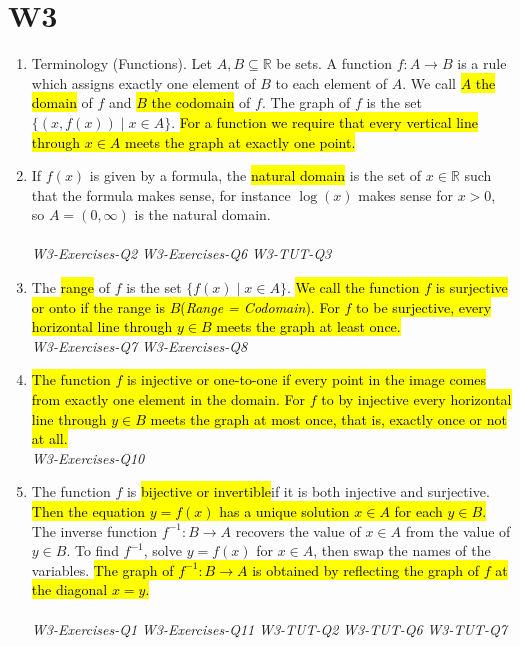 \documentclass[10pt]{article}
\begin{document}
\newpage


\section{W3}

\begin{enumerate}
\item Terminology (Functions). Let $A, B \subseteq \mathbb{R}$ be sets. A function $f: A \rightarrow B$ is a rule which assigns exactly one element of $B$ to each element of $A$. We call \hl{$A$ the domain} of $f$ and\hl{ $B$ the codomain} of $f$. The graph of $f$ is the set $\{(x, f(x)) \mid x \in A\}$. \hl{For a function we require that every vertical line through $x \in A$ meets the graph at exactly one point.}

\item If $f(x)$ is given by a formula, the \hl{natural domain} is the set of $x \in \mathbb{R}$ such that the formula makes sense, for instance $\log (x)$ makes sense for $x>0$, so $A=(0, \infty)$ is the natural domain.\\\\
\textit{W3-Exercises-Q2}
\textit{W3-Exercises-Q6}
\textit{W3-TUT-Q3}

\item The \hl{range} of $f$ is the set $\{f(x) \mid x \in A\}$. \hl{We call the function $f$ is surjective or onto if the range is $B$(\textit{Range = Codomain}). For $f$ to be surjective, every horizontal line through $y \in B$ meets the graph at least once.}\\
\textit{W3-Exercises-Q7}
\textit{W3-Exercises-Q8}

\item \hl{The function $f$ is injective or one-to-one if every point in the image comes from exactly one element in the domain. For $f$ to by injective every horizontal line through $y \in B$ meets the graph at most once, that is, exactly once or not at all.}\\
\textit{W3-Exercises-Q10}

\item The function $f$ is \hl{bijective or invertible}if it is both injective and surjective. \hl{Then the equation $y=f(x)$ has a unique solution $x \in A$ for each $y \in B$. }The inverse function $f^{-1}: B \rightarrow A$ recovers the value of $x \in A$ from the value of $y \in B$. To find $f^{-1}$, solve $y=f(x)$ for $x \in A$, then swap the names of the variables. \hl{The graph of $f^{-1}: B \rightarrow A$ is obtained by reflecting the graph of $f$ at the diagonal $x=y$.}\\\\
\textit{W3-Exercises-Q1}
\textit{W3-Exercises-Q11}
\textit{W3-TUT-Q2}
\textit{W3-TUT-Q6}
\textit{W3-TUT-Q7}


\end{enumerate}
\end{document}
